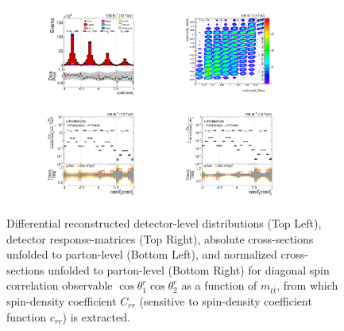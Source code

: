 \clearpage
\begin{figure}[htb]
\begin{center}
 \includegraphics[width=0.40\textwidth]{fig_fullRun2UL/controlplots/combined/Hyp_LLBarCrr_vs_TTBarMass.pdf}
 \includegraphics[width=0.40\textwidth]{fig_fullRun2UL/unfolding/combined/ResponseMatrix_c_rr_mttbar.pdf} \\
 \includegraphics[width=0.40\textwidth]{fig_fullRun2UL/unfolding/combined/UnfoldedResults_c_rr_mttbar.pdf}
 \includegraphics[width=0.40\textwidth]{fig_fullRun2UL/unfolding/combined/UnfoldedResultsNorm_c_rr_mttbar.pdf} \\
\label{fig:c_rr_mttbar}
\caption{Differential reconstructed detector-level distributions (Top Left), detector response-matrices (Top Right), absolute cross-sections unfolded to parton-level (Bottom Left), and normalized cross-sections unfolded to parton-level (Bottom Right) for diagonal spin correlation observable $\cos\theta_{1}^{r}\cos\theta_{2}^{r}$ as a function of $m_{t\bar{t}}$, from which spin-density coefficient $C_{rr}$ (sensitive to spin-density coefficient function $c_{r r}$) is extracted.}
\end{center}
\end{figure}
